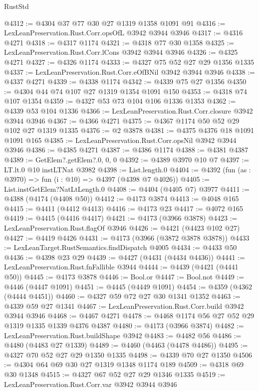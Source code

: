 \begin{lexlean}{RustStd}
\begin{coremodule}
@4312 := @4304 @37 @77 @30 @27 @1319 @1358 @1091 @91
@4316 := LexLeanPreservation.Rust.Corr.opsOfL @3942 @3944 @3946
@4317 := @4316 @4271
@4318 := @4317 @1174
@4321 := @4318 @77 @30 @1358
@4325 := LexLeanPreservation.Rust.Corr.lCons @3942 @3944 @3946
@4326 := @4325 @4271
@4327 := @4326 @1174
@4333 := @4327 @75 @52 @27 @29 @1356 @1335
@4337 := LexLeanPreservation.Rust.Corr.eOfBNil @3942 @3944 @3946
@4338 := @4337 @4271
@4339 := @4338 @1174
@4342 := @4339 @75 @27 @1356
@4350 := @4304 @44 @74 @107 @27 @1319 @1354 @1091 @150
@4353 := @4318 @74 @107 @1354
@4359 := @4327 @53 @73 @104 @106 @1336 @1353
@4362 := @4339 @53 @104 @1336
@4366 := LexLeanPreservation.Rust.Corr.closure @3942 @3944 @3946
@4367 := @4366 @4271
@4375 := @4367 @1174 @50 @52 @29 @102 @27 @1319 @1335
@4376 := @2 @3878
@4381 := @4375 @4376 @18 @1091 @1091 @165
@4385 := LexLeanPreservation.Rust.Corr.opsNil @3942 @3944 @3946
@4386 := @4385 @4271
@4387 := @4386 @1174
@4388 := @4381 @4387
@4389 := GetElem?.getElem?.{0, 0, 0}
@4392 := @4389 @3970 @10 @7
@4397 := LT.lt.{0} @10 instLTNat @3982
@4398 := List.length.{0}
@4404 := @4392 (fun (as : @3970) => fun (i : @10) => @4397 (@4398 @7 @4026))
@4405 := List.instGetElem?NatLtLength.{0}
@4408 := @4404 (@4405 @7) @3977
@4411 := @4388 (@4174 (@4408 @50))
@4412 := @4173 @3874
@4413 := @4048 @165
@4415 := @4411 (@4412 @4413)
@4416 := @4173 @23
@4417 := @4072 @165
@4419 := @4415 (@4416 @4417)
@4421 := @4173 (@3966 @3878)
@4423 := LexLeanPreservation.Rust.flagOf @3946
@4426 := @4421 (@4423 @102 @27)
@4427 := @4419 @4426
@4431 := @4173 (@3966 (@3872 @3878 @3878))
@4433 := LexLeanTarget.RustSemantics.findDispatch @4005
@4434 := @4433 @50
@4436 := @4398 @23 @29
@4439 := @4427 (@4431 (@4434 @4436))
@4441 := LexLeanPreservation.Rust.fnFallible @3944
@4444 := @4439 (@4421 (@4441 @50))
@4445 := @4173 @3878
@4446 := Bool.or
@4447 := Bool.not
@4449 := @4446 (@4447 @1091)
@4451 := @4445 (@4449 @1091)
@4454 := @4359 (@4362 (@4444 @4451))
@4460 := @4327 @59 @72 @27 @30 @1341 @1352
@4463 := @4339 @59 @27 @1341
@4467 := LexLeanPreservation.Rust.Corr.build @3942 @3944 @3946
@4468 := @4467 @4271
@4478 := @4468 @1174 @56 @27 @52 @29 @1319 @1335 @1339 @4376 @4387
@4480 := @4173 (@3966 @3874)
@4482 := LexLeanPreservation.Rust.buildShape @3942
@4483 := @4482 @56
@4486 := @4480 (@4483 @27 @1339)
@4489 := @4460 (@4463 (@4478 @4486))
@4495 := @4327 @70 @52 @27 @29 @1350 @1335
@4498 := @4339 @70 @27 @1350
@4506 := @4304 @64 @69 @30 @27 @1319 @1348 @1174 @189
@4509 := @4318 @69 @30 @1348
@4515 := @4327 @67 @52 @27 @29 @1346 @1335
@4519 := LexLeanPreservation.Rust.Corr.var @3942 @3944 @3946

\end{coremodule}
\end{lexlean}
